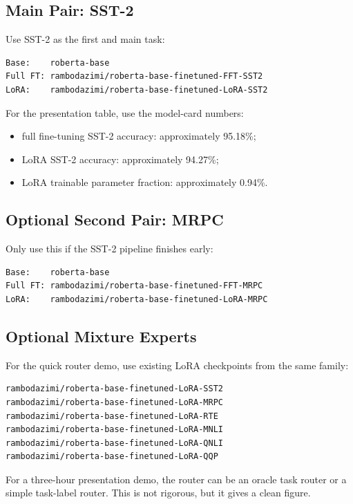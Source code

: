 \documentclass[11pt]{article}
\begin{document}
\subsection{Main Pair: SST-2}

Use SST-2 as the first and main task:

\begin{lstlisting}
Base:    roberta-base
Full FT: rambodazimi/roberta-base-finetuned-FFT-SST2
LoRA:    rambodazimi/roberta-base-finetuned-LoRA-SST2
\end{lstlisting}

For the presentation table, use the model-card numbers:

\begin{itemize}[leftmargin=*]
    \item full fine-tuning SST-2 accuracy: approximately 95.18\%;
    \item LoRA SST-2 accuracy: approximately 94.27\%;
    \item LoRA trainable parameter fraction: approximately 0.94\%.
\end{itemize}

\subsection{Optional Second Pair: MRPC}

Only use this if the SST-2 pipeline finishes early:

\begin{lstlisting}
Base:    roberta-base
Full FT: rambodazimi/roberta-base-finetuned-FFT-MRPC
LoRA:    rambodazimi/roberta-base-finetuned-LoRA-MRPC
\end{lstlisting}

\subsection{Optional Mixture Experts}

For the quick router demo, use existing LoRA checkpoints from the same family:

\begin{lstlisting}
rambodazimi/roberta-base-finetuned-LoRA-SST2
rambodazimi/roberta-base-finetuned-LoRA-MRPC
rambodazimi/roberta-base-finetuned-LoRA-RTE
rambodazimi/roberta-base-finetuned-LoRA-MNLI
rambodazimi/roberta-base-finetuned-LoRA-QNLI
rambodazimi/roberta-base-finetuned-LoRA-QQP
\end{lstlisting}

For a three-hour presentation demo, the router can be an oracle task router or a simple task-label router. This is not rigorous, but it gives a clean figure.
\end{document}
